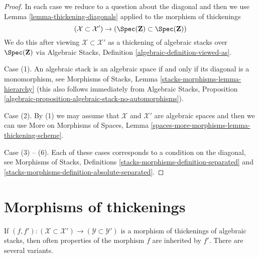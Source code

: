 \begin{proof}
In each case we reduce to a question about the diagonal and then
we use Lemma \ref{lemma-thickening-diagonals} applied to the
morphism of thickenings
$$
(\mathcal{X} \subset \mathcal{X}') \to
\left(\Spec(\mathbf{Z}) \subset \Spec(\mathbf{Z})\right)
$$
We do this after viewing
$\mathcal{X} \subset \mathcal{X}'$ as a thickening of algebraic stacks
over $\Spec(\mathbf{Z})$ via
Algebraic Stacks, Definition \ref{algebraic-definition-viewed-as}.

\medskip\noindent
Case (1). An algebraic stack is an algebraic space if and only if its
diagonal is a monomorphism, see
Morphisms of Stacks, Lemma \ref{stacks-morphisms-lemma-hierarchy}
(this also follows immediately from Algebraic Stacks,
Proposition \ref{algebraic-proposition-algebraic-stack-no-automorphisms}).

\medskip\noindent
Case (2). By (1) we may assume that $\mathcal{X}$ and $\mathcal{X}'$
are algebraic spaces and then we can use
More on Morphisms of Spaces, Lemma
\ref{spaces-more-morphisms-lemma-thickening-scheme}.

\medskip\noindent
Case (3) -- (6). Each of these cases corresponds to a condition
on the diagonal, see Morphisms of Stacks, Definitions
\ref{stacks-morphisms-definition-separated} and
\ref{stacks-morphisms-definition-absolute-separated}.
\end{proof}









\section{Morphisms of thickenings}
\label{section-morphisms-thickenings}

\noindent
If $(f, f') : (\mathcal{X} \subset \mathcal{X}') \to
(\mathcal{Y} \subset \mathcal{Y}')$ is a morphism
of thickenings of algebraic stacks, then often properties of the morphism
$f$ are inherited by $f'$. There are several variants.

